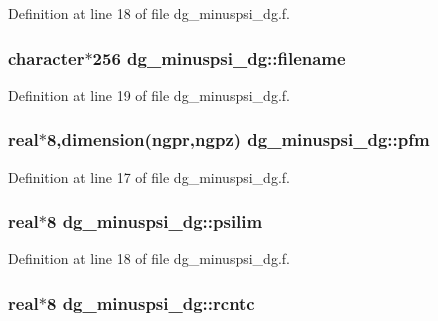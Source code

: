 Definition at line 18 of file dg\_\-minuspsi\_\-dg.f.\hypertarget{namespacedg__minuspsi__dg_2eaba41888ea9b54a4f395da5f6f962c}{
\subsubsection[filename]{\setlength{\rightskip}{0pt plus 5cm}character$\ast$256 {\bf dg\_\-minuspsi\_\-dg::filename}}}
\label{namespacedg__minuspsi__dg_2eaba41888ea9b54a4f395da5f6f962c}




Definition at line 19 of file dg\_\-minuspsi\_\-dg.f.\hypertarget{namespacedg__minuspsi__dg_7c52d7de062161616c4daae88f302c48}{
\subsubsection[pfm]{\setlength{\rightskip}{0pt plus 5cm}real$\ast$8,dimension(ngpr,ngpz) {\bf dg\_\-minuspsi\_\-dg::pfm}}}
\label{namespacedg__minuspsi__dg_7c52d7de062161616c4daae88f302c48}




Definition at line 17 of file dg\_\-minuspsi\_\-dg.f.\hypertarget{namespacedg__minuspsi__dg_9a8c4ea8cf9c956b104c5de7d7f3bf43}{
\subsubsection[psilim]{\setlength{\rightskip}{0pt plus 5cm}real$\ast$8 {\bf dg\_\-minuspsi\_\-dg::psilim}}}
\label{namespacedg__minuspsi__dg_9a8c4ea8cf9c956b104c5de7d7f3bf43}




Definition at line 18 of file dg\_\-minuspsi\_\-dg.f.\hypertarget{namespacedg__minuspsi__dg_d70201e77c046670a22c0a662cf3ade5}{
\subsubsection[rcntc]{\setlength{\rightskip}{0pt plus 5cm}real$\ast$8 {\bf dg\_\-minuspsi\_\-dg::rcntc}}}
\label{namespacedg__minuspsi__dg_d70201e77c046670a22c0a662cf3ade5}




